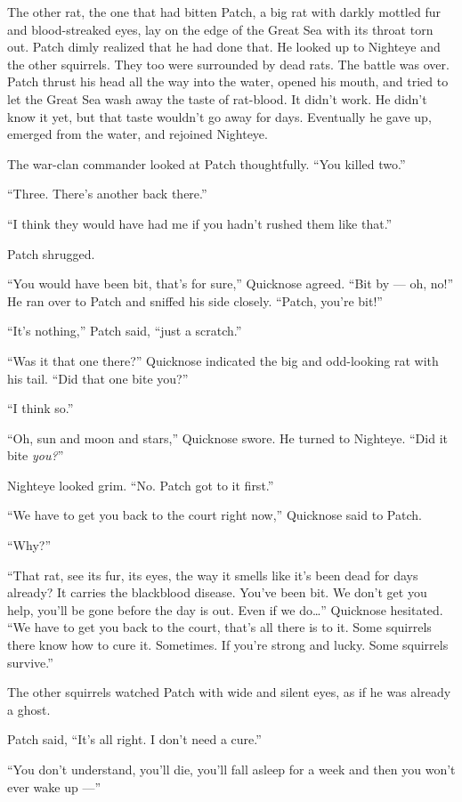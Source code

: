 \documentclass[ebook,oneside,openany,12pt]{memoir}
\begin{document}
The other rat, the one that had bitten Patch, a big rat with darkly
mottled fur and blood-streaked eyes, lay on the edge of the Great Sea
with its throat torn out. Patch dimly realized that he had done
that. He looked up to Nighteye and the other squirrels. They too were
surrounded by dead rats. The battle was over. Patch thrust his head
all the way into the water, opened his mouth, and tried to let the
Great Sea wash away the taste of rat-blood. It didn’t work. He didn’t
know it yet, but that taste wouldn’t go away for days. Eventually he
gave up, emerged from the water, and rejoined Nighteye.

The war-clan commander looked at Patch thoughtfully. “You killed two.”

“Three. There’s another back there.”

“I think they would have had me if you hadn’t rushed them like that.”

Patch shrugged.

“You would have been bit, that’s for sure,” Quicknose agreed. “Bit by
— oh, no!” He ran over to Patch and sniffed his side closely. “Patch,
you’re bit!”

“It’s nothing,” Patch said, “just a scratch.”

“Was it that one there?” Quicknose indicated the big and odd-looking
rat with his tail. “Did that one bite you?”

“I think so.”

“Oh, sun and moon and stars,” Quicknose swore. He turned to
Nighteye. “Did it bite \emph{you?}”

Nighteye looked grim. “No. Patch got to it first.”

“We have to get you back to the court right now,” Quicknose said to
Patch.

“Why?”

“That rat, see its fur, its eyes, the way it smells like it’s been
dead for days already? It carries the blackblood disease. You’ve been
bit. We don’t get you help, you’ll be gone before the day is out. Even
if we do…” Quicknose hesitated. “We have to get you back to the court,
that’s all there is to it. Some squirrels there know how to cure
it. Sometimes. If you’re strong and lucky. Some squirrels survive.”

The other squirrels watched Patch with wide and silent eyes, as if he
was already a ghost.

Patch said, “It’s all right. I don’t need a cure.”

“You don’t understand, you’ll die, you’ll fall asleep for a week and
then you won’t ever wake up —”
\end{document}
